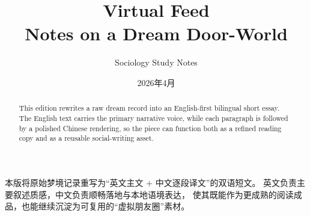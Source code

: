 


\title{\textbf{Virtual Feed}\\[6pt]\large Notes on a Dream Door-World}
\author{Sociology Study Notes}
\date{2026年4月}



\maketitle
\thispagestyle{empty}

\begin{abstract}
This edition rewrites a raw dream record into an English-first bilingual short essay.
The English text carries the primary narrative voice, while each paragraph is followed by a polished Chinese rendering,
so the piece can function both as a refined reading copy and as a reusable social-writing asset.
\end{abstract}

\begin{translationbox}
本版将原始梦境记录重写为“英文主文 + 中文逐段译文”的双语短文。
英文负责主要叙述质感，中文负责顺畅落地与本地语境表达，
使其既能作为更成熟的阅读成品，也能继续沉淀为可复用的“虚拟朋友圈”素材。
\end{translationbox}

\tableofcontents
\newpage




